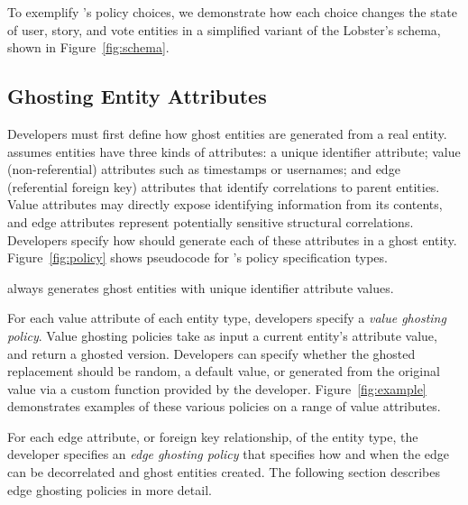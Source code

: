 To exemplify \sys's policy choices, we demonstrate how each choice changes the state of user, story,
and vote entities in a simplified variant of the Lobster's schema, shown in Figure~\ref{fig:schema}.

\subsection{Ghosting Entity Attributes}
\label{sec:ghosting}
Developers must first define how ghost entities are generated from a real entity.
\sys assumes entities have three kinds of attributes: a unique identifier attribute; 
value (non-referential) attributes such as timestamps or usernames; and 
edge (referential foreign key) attributes that identify correlations to parent entities. 
Value attributes may directly expose identifying information from its
contents, and edge attributes represent potentially sensitive structural correlations. 
Developers specify how \sys should generate each of these attributes in a ghost entity.
Figure~\ref{fig:policy} shows pseudocode for \sys's policy specification types.

\sys always generates ghost entities with unique identifier attribute values.

For each value attribute of each entity type, developers specify a \emph{value ghosting policy}.
Value ghosting policies take as input a current entity's attribute value, and return a ghosted
version. Developers can specify whether the ghosted replacement should be random, a default value,
or generated from the original value via a custom function provided by the developer.
Figure~\ref{fig:example} demonstrates examples of these various policies on a range of
value attributes.

For each edge attribute, or foreign key relationship, of the entity type, the developer specifies an
\emph{edge ghosting policy} that specifies how and when the edge can be decorrelated and ghost
entities created.  The following section describes edge ghosting policies in more detail.


%

